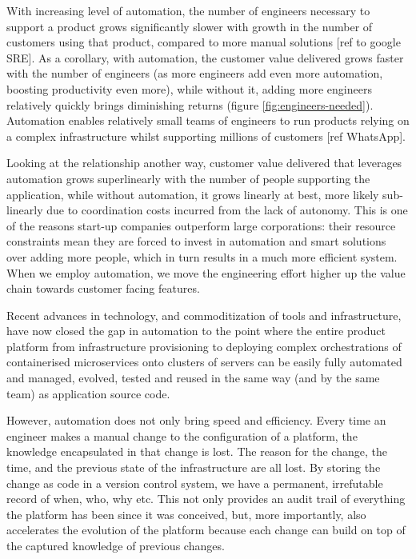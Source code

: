 \documentclass[reprint,amsmath,amssymb,aps]{revtex4-1}
\begin{document}
With increasing level of automation, the number of engineers necessary to support a product grows significantly slower with growth in the number of customers using that product, compared to more manual solutions [ref to google SRE]. As a corollary, with automation, the customer value delivered grows faster with the number of engineers (as more engineers add even more automation, boosting productivity even more), while without it, adding more engineers relatively quickly brings diminishing returns (figure \ref{fig:engineers-needed}). Automation enables relatively small teams of engineers to run products relying on a complex infrastructure whilst supporting millions of customers [ref WhatsApp].

Looking at the relationship another way, customer value delivered that leverages automation grows superlinearly with the number of people supporting the application, while without automation, it grows linearly at best, more likely sub-linearly due to coordination costs incurred from the lack of autonomy. This is one of the reasons start-up companies outperform large corporations: their resource constraints mean they are forced to invest in automation and smart solutions over adding more people, which in turn results in a much more efficient system. When we employ automation, we move the engineering effort higher up the value chain towards customer facing features.

Recent advances in technology, and commoditization of tools and infrastructure, have now closed the gap in automation to the point where the entire product platform from infrastructure provisioning to deploying complex orchestrations of containerised microservices onto clusters of servers can be easily fully automated and managed, evolved, tested and reused in the same way (and by the same team) as application source code.

However, automation does not only bring speed and efficiency. Every time an engineer makes a manual change to the configuration of a platform, the knowledge encapsulated in that change is lost. The reason for the change, the time, and the previous state of the infrastructure are all lost. By storing the change as code in a version control system, we have a permanent, irrefutable record of when, who, why etc. This not only provides an audit trail of everything the platform has been since it was conceived, but, more importantly, also accelerates the evolution of the platform because each change can build on top of the captured knowledge of previous changes.
\end{document}
